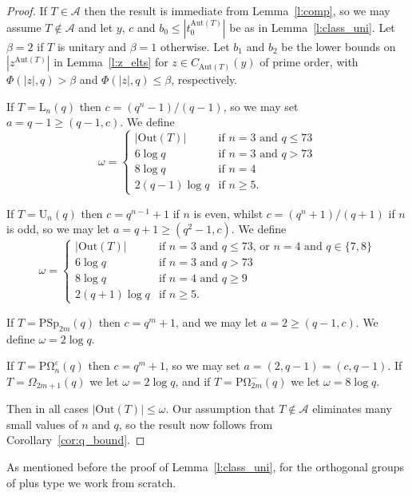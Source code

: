 \documentclass[twoside,a4paper,reqno,11pt]{amsart}
\newcommand{\e}{\varepsilon}
\newcommand{\<}{\langle}
\renewcommand{\>}{\rangle}
\newcommand{\leqs}{\leqslant}
\newcommand{\geqs}{\geqslant}
\def\ge{\geqs}
\def\le{\leqs}
\newcommand{\Aut}{\mathrm{Aut}}
\newcommand{\Out}{\mathrm{Out}}
\newcommand{\PSp}{\mathrm{PSp}}
\newcommand{\POmega}{\mathrm{P\Omega}}
\newcommand{\LL}{\mathrm{L}}
\newcommand{\UU}{\mathrm{U}}
\theoremstyle{definition}
\begin{document}
\begin{proof}  
If $T \in \mathcal{A}$ then the result is immediate from Lemma~\ref{l:comp}, so we may assume $T\notin \mathcal{A}$ and let $y$, $c$ and $b_0 \leqs |t_0^{\Aut(T)}|$ be as in Lemma~\ref{l:class_uni}.  Let $\beta =2$ if $T$ is unitary and $\beta = 1$ otherwise. Let $b_1$ and $b_2$ be the lower bounds on $|z^{\Aut(T)}|$ in Lemma~\ref{l:z_elts} for $z \in C_{\Aut(T)}(y)$ of prime order, with $\Phi(|z|,q) > \beta$ and $\Phi(|z|,q) \le \beta$, respectively.


If $T = \LL_n(q)$  then $c =(q^n-1)/(q-1)$, so  we may set $a = q-1 \geqs (q-1, c)$. We define
\[ \omega = 
\begin{cases}
   |\Out(T)| & \mbox{if $n = 3$ and $q \leqs 73$}\\
   6\log q & \mbox{if $n = 3$ and $q > 73$}\\
   8\log q & \mbox{if $n = 4$}\\
    2(q-1)\log q & \mbox{if $n \geqs 5$.} 
\end{cases}
\]

If $T = \UU_n(q)$ then $c = q^{n-1} + 1$ if $n$ is even, whilst  $c = (q^n+1)/(q+1)$ if $n$ is odd, so we may let $a = q+1 \geqs (q^2-1, c)$. We define 
\[ \omega = 
\begin{cases}
   |\Out(T)| & \mbox{if $n = 3$ and $q \leqs 73$, or $n = 4$ and $q\in\{7,8\}$}\\
   6\log q & \mbox{if $n = 3$ and $q > 73$}\\
   8\log q & \mbox{if $n = 4$ and $q \geqs 9$}\\
   2(q+1)\log q & \mbox{if $n \geqs 5$.} 
\end{cases}
\]

If $T = \PSp_{2m}(q)$ then $c = q^m+1$, and we may let $a = 2 \ge (q-1, c)$. 
We define $\omega = 2\log q$.

If $T = \POmega^\e_n(q)$ then $c = q^m+1$, so we may set $a = (2, q-1) = (c, q-1)$. If $T = 
\Omega_{2m+1}(q)$ we let $\omega = 2\log q$, and if $T = \POmega_{2m}^-(q)$ we let $\omega = 8 \log q$.
    
Then in all cases  $|\Out(T)| \leqs \omega$. Our assumption that $T \not\in \mathcal{A}$ eliminates many small values of $n$ and $q$, so
the result now follows from Corollary~\ref{cor:q_bound}.
\end{proof}


As mentioned before the proof of Lemma~\ref{l:class_uni},
for the orthogonal groups of plus type we work from scratch.
\end{document}
